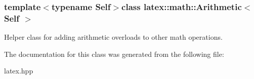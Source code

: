 \subsubsection*{template$<$typename \-Self$>$class latex\-::math\-::\-Arithmetic$<$ Self $>$}

\-Helper class for adding arithmetic overloads to other math operations. 

\-The documentation for this class was generated from the following file\-:\begin{DoxyCompactItemize}
\item 
latex.\-hpp\end{DoxyCompactItemize}
